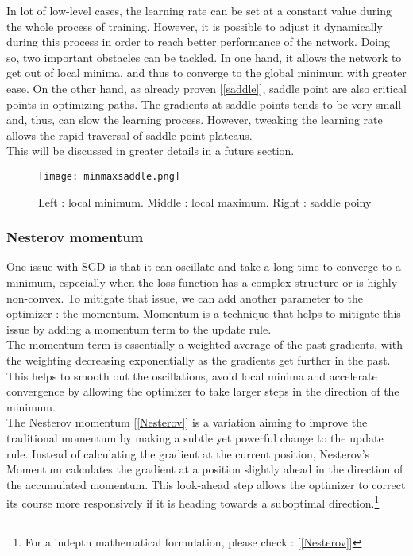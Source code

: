 \documentclass [12pt] {article}
\numberwithin{equation}{section} %
\numberwithin{figure}{section}   %
\begin{document}
In lot of low-level cases, the learning rate can be set at a constant value during the whole process of training. However, it is possible to adjust it dynamically during this process in order to reach better performance of the network. Doing so, two important obstacles can be tackled. In one hand, it allows the network to get out of local minima, and thus to converge to the global minimum with greater ease. On the other hand, as already proven [\ref{saddle}], saddle point are also critical points in optimizing paths. The gradients at saddle points tends to be very small and, thus, can slow the learning process. However, tweaking the learning rate allows the rapid traversal of saddle point plateaus.\\
This will be discussed in greater details in a future section.\\

\begin{figure}[H]
    \centering
    \texttt{[image: minmaxsaddle.png]}
    \caption{Left : local minimum. Middle : local maximum. Right : saddle poiny}
    \label{fig:enter-label}
\end{figure}


\subsubsection*{Nesterov momentum}

One issue with SGD is that it can oscillate and take a long time to converge to a minimum, especially when the loss function has a complex structure or is highly non-convex. To mitigate that issue, we can add another parameter to the optimizer : the momentum.
Momentum is a technique that helps to mitigate this issue by adding a momentum term to the update rule.\\

The momentum term is essentially a weighted average of the past gradients, with the weighting decreasing exponentially as the gradients get further in the past. This helps to smooth out the oscillations, avoid local minima and accelerate convergence by allowing the optimizer to take larger steps in the direction of the minimum.\\

The Nesterov momentum [\ref{Nesterov}] is a variation aiming to improve the traditional momentum by making a subtle yet powerful change to the update rule. Instead of calculating the gradient at the current position, Nesterov’s Momentum calculates the gradient at a position slightly ahead in the direction of the accumulated momentum. This look-ahead step allows the optimizer to correct its course more responsively if it is heading towards a suboptimal direction.\footnote{For a indepth mathematical formulation, please check : [\ref{Nesterov}]}\\  
\end{document}
